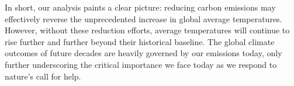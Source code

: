 \documentclass[11pt]{amsart}
\begin{document}
\par In short, our analysis paints a clear picture: reducing carbon emissions may effectively reverse the unprecedented increase in global average temperatures.
  However, without these reduction efforts, average temperatures will continue to rise further and further beyond their historical baseline.
  The global climate outcomes of future decades are heavily governed by our emissions today, only further underscoring the critical importance we face today as we respond to nature's call for help.


\FloatBarrier %
\newpage


\end{document}
